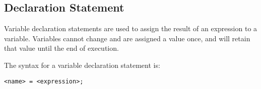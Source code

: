 
\subsection{Declaration Statement}
{
	Variable declaration statements are used to assign the result of an
	expression to a variable. Variables cannot change and are
	assigned a value once, and will retain
	that value until the end of execution.
	
	The syntax for a variable declaration statement is:
	\begin{lstlisting}[texcl = true, language = MAIA]
<name> = <expression>;
	\end{lstlisting}
}

